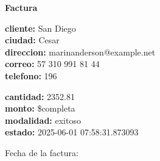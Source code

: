 \documentclass{article}
\begin{document}
\begin{center}
    {\LARGE \textbf{Factura}}\\[1cm]
\end{center}

\textbf{cliente:} San Diego \\
\textbf{ciudad:} Cesar \\
\textbf{direccion:} marinanderson@example.net \\
\textbf{correo:} 57 310 991 81 44 \\
\textbf{telefono:} 196 \\

\vspace{0.5cm}

\textbf{cantidad:} 2352.81 \\
\textbf{monto:} \$completa \\
\textbf{modalidad:} exitoso \\
\textbf{estado:} 2025-06-01 07:58:31.873093 \\

\vspace{1cm}

Fecha de la factura: 
\end{document}

